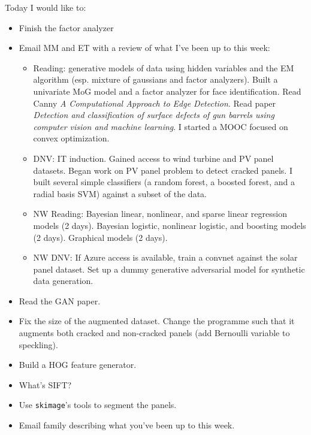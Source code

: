 \documentclass[idxtotoc,hyperref,openany]{labbook} %
\begin{document}
Today I would like to:
\begin{itemize}
	\item Finish the factor analyzer
	\item Email MM and ET with a review of what I've been up to this week:
	\begin{itemize}
		\item Reading: generative models of data using hidden variables and the EM algorithm (esp. mixture of gaussians and factor analyzers). Built a univariate MoG model and a factor analyzer for face identification. Read Canny \emph{A Computational Approach to Edge Detection}. Read paper \emph{Detection and classification of surface defects of gun barrels using computer vision and machine learning}. I started a MOOC focused on convex optimization.
		\item DNV: IT induction. Gained access to wind turbine and PV panel datasets. Began work on PV panel problem to detect cracked panels. I built several simple classifiers (a random forest, a boosted forest, and a radial basis SVM) against a subset of the data.
		\item NW Reading: Bayesian linear, nonlinear, and sparse linear regression models (2 days). Bayesian logistic, nonlinear logistic, and boosting models (2 days). Graphical models (2 days).
		\item NW DNV: If Azure access is available, train a convnet against the solar panel dataset. Set up a dummy generative adversarial model for synthetic data generation.
	\end{itemize}
	\item Read the GAN paper.
	\item Fix the size of the augmented dataset. Change the programme such that it augments both cracked and non-cracked panels (add Bernoulli variable to speckling).
	\item Build a HOG feature generator.
	\item What's SIFT?
	\item Use \texttt{skimage}'s tools to segment the panels.
	\item Email family describing what you've been up to this week.
\end{itemize}
\end{document}
